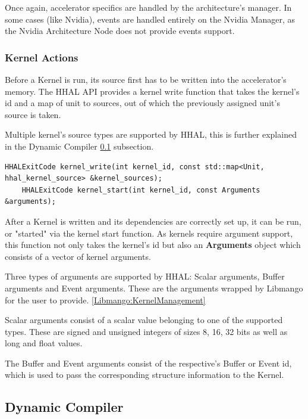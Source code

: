 Once again, accelerator specifics are handled by the architecture's manager. In some cases (like Nvidia), events are handled entirely on the Nvidia Manager, as the Nvidia Architecture Node does not provide events support.

\subsubsection{Kernel Actions} \label{HHAL:KernelActions}
Before a Kernel is run, its source first has to be written into the accelerator's memory. The HHAL API provides a kernel write function that takes the kernel's id and a map of unit to sources, out of which the previously assigned unit's source is taken.

Multiple kernel's source types are supported by HHAL, this is further explained in the Dynamic Compiler \ref{HHAL:DynamicCompiler} subsection.

\begin{lstlisting}[style=CStyle, caption=HHAL API - Kernel actions]
    HHALExitCode kernel_write(int kernel_id, const std::map<Unit, hhal_kernel_source> &kernel_sources);
    HHALExitCode kernel_start(int kernel_id, const Arguments &arguments);
\end{lstlisting}

After a Kernel is written and its dependencies are correctly set up, it can be run, or "started" via the kernel start function. As kernels require argument support, this function not only takes the kernel's id but also an \textbf{Arguments} object which consists of a vector of kernel arguments.

Three types of arguments are supported by HHAL: Scalar arguments, Buffer arguments and Event arguments. These are the arguments wrapped by Libmango for the user to provide. \ref{Libmango:KernelManagement} 

Scalar arguments consist of a scalar value belonging to one of the supported types. These are signed and unsigned integers of sizes 8, 16, 32 bits as well as long and float values. 

The Buffer and Event arguments consist of the respective's Buffer or Event id, which is used to pass the corresponding structure information to the Kernel.

\subsection{Dynamic Compiler} \label{HHAL:DynamicCompiler}

